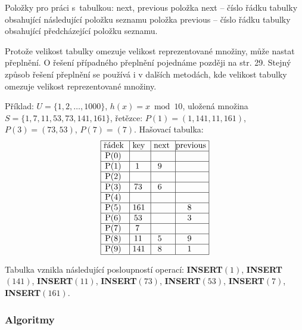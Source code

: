 \documentclass[a4paper,12pt]{article}
\begin{document}
Položky pro práci s~tabulkou: next, previous\newline 
\phantom{---}položka next -- číslo řádku tabulky 
obsahující následující polož\-ku seznamu\newline 
\phantom{---}položka previous -- číslo řádku tabulky obsahující 
předcházející položku seznamu.

Pro\-to\-že ve\-li\-kost ta\-bul\-ky o\-me\-zu\-je ve\-li\-kost re\-pre\-zen\-to\-va\-né mno\-ži\-ny, mů\-že na\-stat pře\-pl\-ně\-ní. O řešení 
případného přeplnění pojednáme později na str. 29. Stejný způsob řešení přeplnění se používá i v dalších metodách, kde velikost tabulky omezuje velikost reprezentované množiny.

Příklad: $U=\{1,2,\dots,1000\}$, $h(x)=x\bmod10$,\newline 
uložená množina $S=\{1,7,11,53,73,141,161\}$,\newline 
řetězce: $P(1)=(1,141,11,161)$, 
$P(3)=(73,53)$, $P(7)=(7)$.\newline 
Hašovací tabulka:
$$\vtop{\offinterlineskip\halign {\strut\vrule\ # & \vrule\ # & \vrule\ # & \vrule \hfil # \hfil \vrule\cr\noalign{\hrule}řádek & key & next & previous\hfil \cr\noalign{\hrule}P(0) & & & \hfill \cr\noalign{\hrule}P(1) & 1 & 9 & \hfill \cr\noalign{\hrule}P(2) & & & \hfill \cr\noalign{\hrule}P(3) & 73 & 6 & \hfill \cr\noalign{\hrule}P(4) & & &\hfill \cr\noalign{\hrule}P(5) & 161 & & 8 \cr\noalign{\hrule}P(6) & 53 & & 3 \cr\noalign{\hrule}P(7) & 7 & &\hfill \cr\noalign{\hrule}P(8) & 11 & 5 & 9 \cr\noalign{\hrule}P(9) & 141 & 8 & 1 \cr\noalign{\hrule}}}$$

Tabulka vznikla následující posloupností 
operací:\newline 
{\bf INSERT$(1)$}, {\bf INSERT$(141)$}, {\bf INSERT$(11)$}, {\bf INSERT$
(73)$}, 
{\bf INSERT$(53)$},\newline 
{\bf INSERT$(7)$}, {\bf INSERT$(161)$}. 

\subsubsection{Algoritmy}
\end{document}
